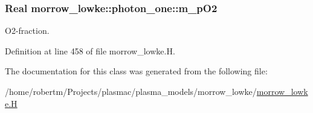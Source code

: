 \subsubsection[{\texorpdfstring{m\+\_\+p\+O2}{m_pO2}}]{\setlength{\rightskip}{0pt plus 5cm}Real morrow\+\_\+lowke\+::photon\+\_\+one\+::m\+\_\+p\+O2\hspace{0.3cm}{\ttfamily [protected]}}\hypertarget{classmorrow__lowke_1_1photon__one_a216b1a4809db1b3c1b1ac8ac1957dc86}{}\label{classmorrow__lowke_1_1photon__one_a216b1a4809db1b3c1b1ac8ac1957dc86}


O2-\/fraction. 



Definition at line 458 of file morrow\+\_\+lowke.\+H.



The documentation for this class was generated from the following file\+:\begin{DoxyCompactItemize}
\item 
/home/robertm/\+Projects/plasmac/plasma\+\_\+models/morrow\+\_\+lowke/\hyperlink{morrow__lowke_8H}{morrow\+\_\+lowke.\+H}\end{DoxyCompactItemize}
